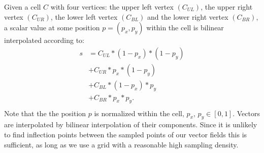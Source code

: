 Given a cell $C$ with four vertices: the upper left vertex $(C_{UL})$, the upper right vertex $(C_{UR})$, the lower left vertex $(C_{BL})$ and the lower right vertex $(C_{BR})$, a scalar value at some position $p = (p_x, p_y)$ within the cell is bilinear interpolated according to:
\begin{align*}
	s & = C_{UL} * (1 - p_x ) * (1 - p_y) \\
		& +	C_{UR} *  p_x  * (1 - p_y) \\
		& +	C_{BL} *  (1 - p_x ) * p_y \\
		& +	C_{BR} *  p_x  * p_y. \\
\end{align*}
Note that the the position $p$ is normalized within the cell, \ie $p_x,\, p_y \in [0, 1]$. Vectors are interpolated by bilinear interpolation of their components. Since it is unlikely to find inflection points between the sampled points of our vector fields this is sufficient, as long as we use a grid with a reasonable high sampling density.

